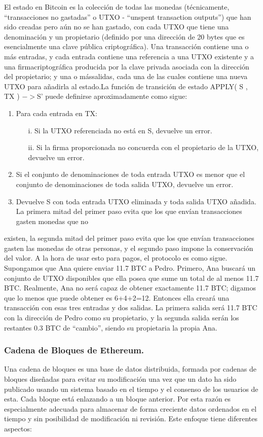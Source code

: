 \documentclass[11pt,a4paper]{article}
\begin{document}
El estado en Bitcoin es la colección de todas las monedas (técnicamente, “transacciones no gastadas” o UTXO - “unspent transaction outputs”) que han sido creadas pero aún no se han gastado, con cada UTXO que tiene una denominación y un propietario (definido por una dirección de 20 bytes que es esencialmente una clave pública criptográfica). Una transacción contiene una o más entradas, y cada entrada contiene una referencia a una UTXO existente y a una firmacriptográfica producida por la clave privada asociada con la dirección del propietario; y una o mássalidas, cada una de las cuales contiene una nueva UTXO para añadirla al estado.La función de transición de estado APPLY( S , TX ) $->$S' puede definirse aproximadamente como sigue:
\begin{enumerate}
\item Para cada entrada en TX:
  \begin{enumerate}
  \item[i.] Si la UTXO referenciada no está en S, devuelve un error.
  \item[ii.] Si la firma proporcionada no concuerda con el propietario de la UTXO, devuelve un error.
  \end{enumerate}
\item Si el conjunto de denominaciones de toda entrada UTXO es menor que el conjunto de
  denominaciones de toda salida UTXO, devuelve un error.
\item Devuelve S con toda entrada UTXO eliminada y toda salida UTXO añadida.
  La primera mitad del primer paso evita que los que envían transacciones gasten monedas que no
\end{enumerate}
existen, la segunda mitad del primer paso evita que los que envían transacciones gasten las monedas de otras personas, y el segundo paso impone la conservación del valor. A la hora de usar esto para pagos, el protocolo es como sigue. Supongamos que Ana quiere enviar 11.7 BTC a Pedro. Primero, Ana buscará un conjunto de UTXO disponibles que ella posea que sume un total de al menos 11.7 BTC. Realmente, Ana no será capaz de obtener exactamente 11.7 BTC; digamos que lo menos que puede obtener es 6+4+2=12. Entonces ella creará una transacción con esas tres entradas y dos salidas. La primera salida será 11.7 BTC con la dirección de Pedro como su propietario, y la segunda salida serán los restantes 0.3 BTC de “cambio”, siendo su propietaria la propia Ana.

\subsubsection{Cadena de Bloques de Ethereum.}
Una cadena de bloques es una base de datos distribuida, formada por cadenas de bloques diseñadas para evitar su modificación una vez que un dato ha sido publicado usando un sistema basado en el tiempo y el consenso de los usuarios de esta. Cada bloque está enlazando a un bloque anterior. Por esta razón es especialmente adecuada para almacenar de forma creciente datos ordenados en el tiempo y sin posibilidad de modificación ni revisión. Este enfoque tiene diferentes aspectos:
\end{document}
